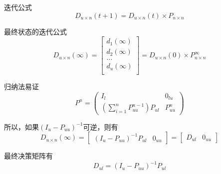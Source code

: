 \documentclass[notheorems, UTF8]{ctexbeamer}
\begin{document}
\begin{frame}
迭代公式
\begin{displaymath}
D_{u \times n}(t + 1) = D_{u \times n}(t) \times P_{n \times n}
\end{displaymath}

最终状态的迭代公式
\begin{displaymath}
D_{u \times n}(\infty) = \left[
\begin{array}{c}
d_1(\infty) \\
d_2(\infty) \\
\ldots \\
d_u(\infty) \\
\end{array}
\right] = D_{u \times n}(0) \times P_{n \times n}^{\infty}
\end{displaymath}

归纳法易证
\begin{displaymath}
P^n =  \left(
\begin{array}{ll}
I_{ l}      & 0_{l u}\\
\left(\sum_{i=1}^{n} P_{uu}^{n-1} \right) P_{ul} & P_{uu}^n
\end{array}
\right) 
\end{displaymath}

所以，如果$(I_u-P_{uu})^{-1}$可逆，则有
\begin{displaymath}
D_{u \times n}(\infty) = \left[
\begin{array}{ll}
(I_u - P_{uu})^{-1}P_{ul} & 0_{uu}
\end{array}
\right] = \left[
\begin{array}{ll}
D_{ul} & 0_{uu}
\end{array}
\right]
\end{displaymath}

最终决策矩阵有
\begin{displaymath}
D_{ul} = (I_u - P_{uu})^{-1}P_{ul}
\end{displaymath}
\end{frame}
\end{document}
